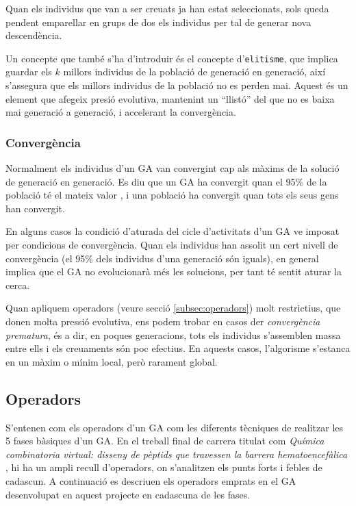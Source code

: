 Quan els individus que van a ser creuats ja han estat seleccionats, sols queda
pendent emparellar en grups de dos els individus per tal de generar nova
descendència. 

Un concepte que també s'ha d'introduir és el concepte d'\texttt{elitisme}, que
implica guardar els $k$ millors individus de la població de generació en
generació, així s'assegura que els millors individus de la població no es perden
mai.  Aquest és un element que afegeix presió evolutiva, mantenint un ``llistó''
del que no es baixa mai generació a generació, i accelerant la convergència.

\subsubsection{Convergència} 

Normalment els individus d'un GA van convergint cap als màxims de la solució de
generació en generació. Es diu que un GA ha convergit quan el 95\% de la
població té el mateix valor \cite{D75}, i una població ha convergit quan tots
els seus gens han convergit.

En alguns casos la condició d'aturada del cicle d'activitats d'un GA ve imposat
per condicions de convergència.  Quan els individus han assolit un cert nivell de
convergència (el 95\% dels individus d'una generació són iguals), en general
implica que el GA no evolucionarà més les solucions, per tant té sentit aturar
la cerca.

Quan apliquem operadors (veure secció \ref{subsec:operadors}) molt restrictius,
que donen molta pressió evolutiva, ens podem trobar en casos der
\emph{convergència prematura}, és a dir, en poques generacions, tots els
individus s'assemblen massa entre ells i els creuaments són poc efectius.  En
aquests casos, l'algorisme s'estanca en un màxim o mínim local, però rarament
global.

\subsection{Operadors\label{subsec:operadors}} 

S'entenen com els operadors d'un GA com les diferents tècniques de realitzar les
5 fases bàsiques d'un GA. En el treball final de carrera titulat com
\emph{Química combinatoria virtual: disseny de pèptids que travessen la barrera
hematoencefàlica} \cite{B01},  hi ha un ampli recull d'operadors, on s'analitzen
els punts forts i febles de cadascun.  A continuació es descriuen els operadors
emprats en el GA desenvolupat en aquest projecte en cadascuna de les fases.


